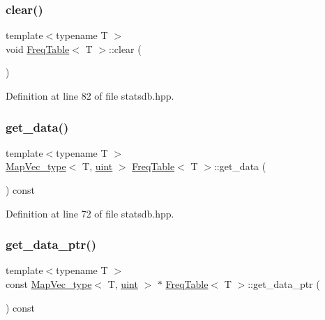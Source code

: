 \subsubsection{\texorpdfstring{clear()}{clear()}}
{\footnotesize\ttfamily template$<$typename T $>$ \\
void \hyperlink{class_freq_table}{Freq\+Table}$<$ T $>$\+::clear (\begin{DoxyParamCaption}{ }\end{DoxyParamCaption})\hspace{0.3cm}{\ttfamily [inline]}}



Definition at line 82 of file statsdb.\+hpp.

\mbox{\label{class_freq_table_a7b99496d1c2f4193654752856b30d1a5}} 
\subsubsection{\texorpdfstring{get\+\_\+data()}{get\_data()}}
{\footnotesize\ttfamily template$<$typename T $>$ \\
\hyperlink{typedefs_8hpp_a02ed8dec96bc528c8bc3d8cb3c4674a5}{Map\+Vec\+\_\+type}$<$ T, \hyperlink{typedefs_8hpp_a91ad9478d81a7aaf2593e8d9c3d06a14}{uint} $>$ \hyperlink{class_freq_table}{Freq\+Table}$<$ T $>$\+::get\+\_\+data (\begin{DoxyParamCaption}{ }\end{DoxyParamCaption}) const\hspace{0.3cm}{\ttfamily [inline]}}



Definition at line 72 of file statsdb.\+hpp.

\mbox{\label{class_freq_table_ab5dd6677f52072c93d18b2b9a3369ae7}} 
\subsubsection{\texorpdfstring{get\+\_\+data\+\_\+ptr()}{get\_data\_ptr()}}
{\footnotesize\ttfamily template$<$typename T $>$ \\
const \hyperlink{typedefs_8hpp_a02ed8dec96bc528c8bc3d8cb3c4674a5}{Map\+Vec\+\_\+type}$<$ T, \hyperlink{typedefs_8hpp_a91ad9478d81a7aaf2593e8d9c3d06a14}{uint} $>$ $\ast$ \hyperlink{class_freq_table}{Freq\+Table}$<$ T $>$\+::get\+\_\+data\+\_\+ptr (\begin{DoxyParamCaption}{ }\end{DoxyParamCaption}) const\hspace{0.3cm}{\ttfamily [inline]}}



